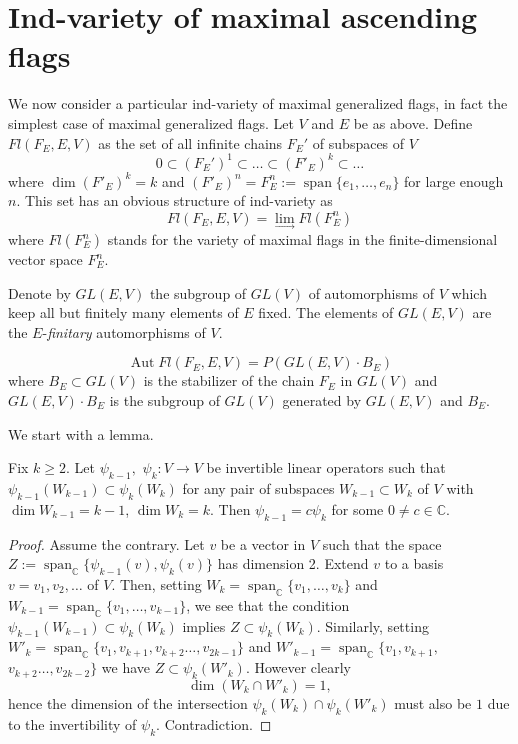 \documentclass[11pt,twoside]{gsp}
\begin{document}
\section{Ind-variety of  maximal ascending flags}
We now consider a particular ind-variety of maximal generalized flags, in fact the simplest case of maximal generalized flags. Let $V$ and $E$ be as above. Define
$Fl(F_E, E, V)$ as the set of all infinite chains $F_E'$ of subspaces of $V$
$$0\subset(F_E')^1\subset\dots\subset(F'_E)^k\subset\dots$$
where $\operatorname{dim}(F'_E)^k=k$ and $(F'_E)^n= F_E^n:=\operatorname{span}\{e_1,\dots,e_n\}$ for large enough $n$. This set has an obvious structure of ind-variety as
$$Fl(F_E,E,V)=\lim_{\longrightarrow}Fl(F_E^n)$$ 
where $Fl(F_E^n)$ stands for the variety of maximal flags in the finite-dimensional vector space $F_E^n$.

Denote by $GL(E,V)$ the subgroup of $GL(V)$  of automorphisms of $V$ which keep all but finitely many elements of $E$ fixed. The elements of $GL(E,V)$ are the $E$-{\it finitary} automorphisms of $V$.

\begin{proposition}
$$\operatorname{Aut}Fl(F_E,E,V)=P(GL(E,V)\cdot B_E)$$
where $B_E\subset GL(V)$ is the stabilizer of the chain $F_E$ in $GL(V)$ and $GL(E,V)\cdot B_E$ is the subgroup of $GL(V)$ generated by $GL(E,V)$ and $B_E$.
\end{proposition}

We start with a lemma.

\begin{lemma}
Fix $k\geq2$. Let $\psi_{k-1},$ $ \psi_k:V\to V$ be invertible linear operators such that $\psi_{k-1}(W_{k-1})\subset\psi_k(W_k)$ for any pair of subspaces $W_{k-1}\subset W_k$ of $V$ with $\operatorname{dim}W_{k-1}=k-1$, $\operatorname{dim}W_k=k$. Then $\psi_{k-1}=c\psi_k$ for some $0\neq c\in\mathbb C$.

\end{lemma}

\begin{proof}
Assume the contrary. Let $v$ be a vector in $V$ such that the space  $Z:=\operatorname{span}_{\mathbb{C}}\{\psi_{k-1}(v), \psi_k(v)\}$ has dimension 2. Extend $v$ to a basis $v=v_1,v_2,\dots$ of $V$. Then, setting $W_k=\operatorname{span}_{\mathbb C}\{v_1,\dots, v_k\}$ and $W_{k-1}=\operatorname{span}_{\mathbb C}\{v_1,\dots, v_{k-1}\}$, we see that the condition $\psi_{k-1}(W_{k-1})\subset\psi_k(W_k)$ implies $Z\subset\psi_k(W_k) $. Similarly, setting $W'_{k}=\operatorname{span}_{\mathbb C}\{v_1,v_{k+1}, v_{k+2}\dots,v_{2k-1}\}$ and $W'_{k-1} = \operatorname{span}_{\mathbb C}\{v_1,v_{k+1},$\\$ v_{k+2}\dots,v_{2k-2}\}$ we have $Z\subset \psi_k(W'_{k})$.
However clearly
$$\operatorname{dim}(W_k \cap W'_k)=1,$$
hence the dimension of the intersection $\psi_k(W_k)\cap\psi_k(W'_{k})$ must also be $1$ due to the invertibility of $\psi_k$.
Contradiction.
\end{proof} 
\end{document}
